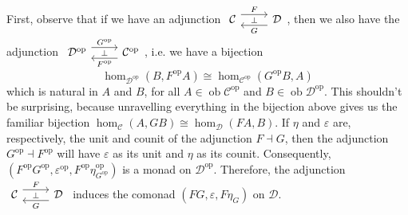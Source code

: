 \documentclass[a4paper,11pt]{article}
\theoremstyle{break_italics}
\theoremstyle{break_upright}
\theoremstyle{remark}
\newcommand{\ob}{\operatorname{ob}}
\newcommand{\C}{\mathcal{C}}
\newcommand{\D}{\mathcal{D}}
\newcommand{\op}{\mathrm{op}}
\begin{document}
First, observe that if we have an adjunction $\begin{tikzcd}
	\C & \D
	\arrow["\bot"{description}, draw=none, from=1-1, to=1-2]
	\arrow["F", shift left=2, from=1-1, to=1-2]
	\arrow["G", shift left=2, from=1-2, to=1-1]
\end{tikzcd}$, then we also have the adjunction $\begin{tikzcd}
	\D^\op & \C^\op
	\arrow["\bot"{description}, draw=none, from=1-1, to=1-2]
	\arrow["G^\op", shift left=2, from=1-1, to=1-2]
	\arrow["F^\op", shift left=2, from=1-2, to=1-1]
\end{tikzcd}$, i.e. we have a bijection
\[
	\hom_{\D^\op}(B, F^\op A) \cong \hom_{\C^\op}(G^\op B, A)
\]
which is natural in $A$ and $B$, for all $A \in \ob\C^\op$ and $B\in\ob\D^\op$. This shouldn't be surprising, because unravelling everything in the bijection above gives us the familiar bijection $\hom_\C(A, GB) \cong \hom_\D(FA, B)$. If $\eta$ and $\varepsilon$ are, respectively, the unit and counit of the adjunction $F \dashv G$, then the adjunction $G^\op \dashv F^\op$ will have $\varepsilon$ as its unit and $\eta$ as its counit. Consequently, $(F^\op G^\op, \varepsilon^\op, F^\op \eta^\op_{G^\op})$ is a monad on $\D^\op$. Therefore, the adjunction $\begin{tikzcd}
	\C & \D
	\arrow["\bot"{description}, draw=none, from=1-1, to=1-2]
	\arrow["F", shift left=2, from=1-1, to=1-2]
	\arrow["G", shift left=2, from=1-2, to=1-1]
\end{tikzcd}$ induces the comonad $(FG, \varepsilon, F\eta_G)$ on $\D$.
\end{document}
